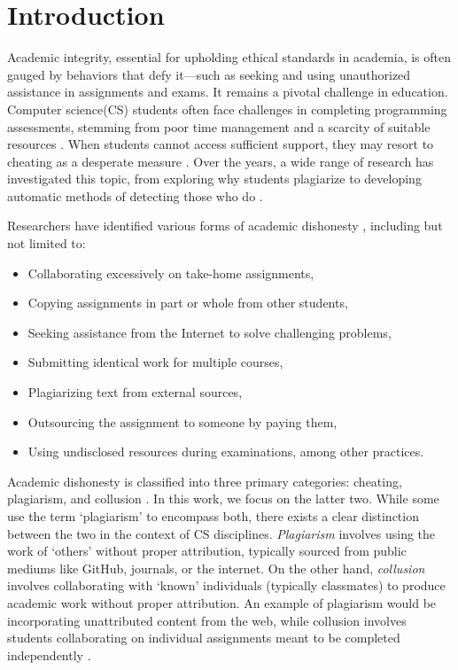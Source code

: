 \section{Introduction} \label{sec:intro}

Academic integrity, essential for upholding ethical standards in academia, is often gauged by behaviors that defy it—such as seeking and using unauthorized assistance in assignments and exams. It remains a pivotal challenge in education. Computer science(CS) students often face challenges in completing programming assessments, stemming from poor time management and a scarcity of suitable resources \cite{10.5555/858403.858418}. When students cannot access sufficient support, they may resort to cheating as a desperate measure \cite{10.1145/3059009.3059065, 10.1145/1632149.1632168}. Over the years, a wide range of research has investigated this topic, from exploring why students plagiarize to developing automatic methods of detecting those who do \cite{10.5120/ijca2015906113}.

Researchers have identified various forms of academic dishonesty \cite{40db574cf24f441d994cbb1cd909bd1f}, including but not limited to:

\begin{itemize}
    \item Collaborating excessively on take-home assignments,
    \item Copying assignments in part or whole from other students,
    \item Seeking assistance from the Internet to solve challenging problems,
    \item Submitting identical work for multiple courses,
    \item Plagiarizing text from external sources,
    \item Outsourcing the assignment to someone by paying them,
    \item Using undisclosed resources during examinations, among other practices.
\end{itemize} 

Academic dishonesty is classified into three primary categories: cheating, plagiarism, and collusion \cite{8937362}. In this work, we focus on the latter two. While some use the term `plagiarism' to encompass both, there exists a clear distinction between the two in the context of CS disciplines. \textit{Plagiarism} involves using the work of `others' without proper attribution, typically sourced from public mediums like GitHub, journals, or the internet. On the other hand, \textit{collusion} involves collaborating with `known' individuals (typically classmates) to produce academic work without proper attribution. An example of plagiarism would be incorporating unattributed content from the web, while collusion involves students collaborating on individual assignments meant to be completed independently \cite{Owunwanne, Fraser2014CollaborationCA,JonesJuliet}.

